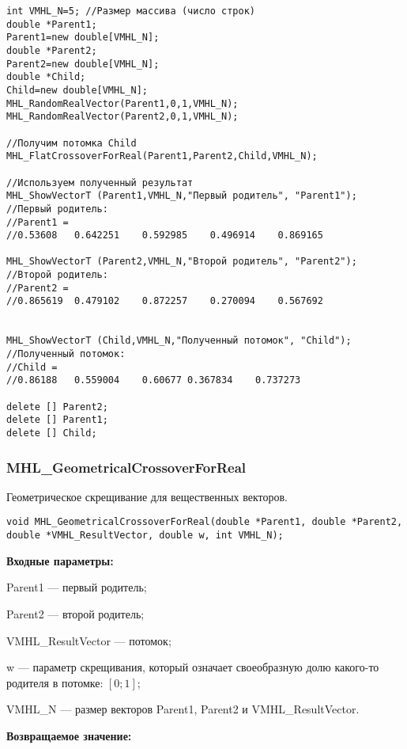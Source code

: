 \documentclass[a4paper,12pt]{article}
\begin{document}
\begin{lstlisting}[label=code_use_MHL_FlatCrossoverForReal,caption=Пример использования]
int VMHL_N=5; //Размер массива (число строк)
double *Parent1;
Parent1=new double[VMHL_N];
double *Parent2;
Parent2=new double[VMHL_N];
double *Child;
Child=new double[VMHL_N];
MHL_RandomRealVector(Parent1,0,1,VMHL_N);
MHL_RandomRealVector(Parent2,0,1,VMHL_N);

//Получим потомка Child
MHL_FlatCrossoverForReal(Parent1,Parent2,Child,VMHL_N);

//Используем полученный результат
MHL_ShowVectorT (Parent1,VMHL_N,"Первый родитель", "Parent1");
//Первый родитель:
//Parent1 =	
//0.53608	0.642251	0.592985	0.496914	0.869165

MHL_ShowVectorT (Parent2,VMHL_N,"Второй родитель", "Parent2");
//Второй родитель:
//Parent2 =
//0.865619	0.479102	0.872257	0.270094	0.567692


MHL_ShowVectorT (Child,VMHL_N,"Полученный потомок", "Child");
//Полученный потомок:
//Child =
//0.86188	0.559004	0.60677	0.367834	0.737273

delete [] Parent2;
delete [] Parent1;
delete [] Child;
\end{lstlisting}

\subsubsection{MHL\_GeometricalCrossoverForReal}\label{MHL_GeometricalCrossoverForReal}

Геометрическое скрещивание для вещественных векторов.


\begin{lstlisting}[label=code_syntax_MHL_GeometricalCrossoverForReal,caption=Синтаксис]
void MHL_GeometricalCrossoverForReal(double *Parent1, double *Parent2, double *VMHL_ResultVector, double w, int VMHL_N);
\end{lstlisting}

\textbf{Входные параметры:}
 
Parent1 --- первый родитель;
 
Parent2 --- второй родитель;
 
VMHL\_ResultVector --- потомок;

w --- параметр скрещивания, который означает своеобразную долю какого-то родителя в потомке: $[0;1]$;
 
VMHL\_N --- размер векторов Parent1, Parent2 и VMHL\_ResultVector.

\textbf{Возвращаемое значение:}
\end{document}
